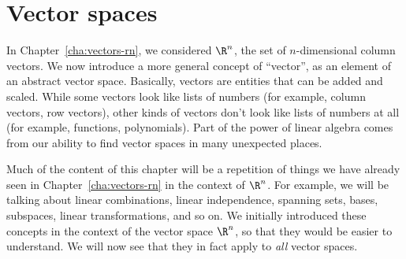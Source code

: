 \chapter{Vector spaces}

In Chapter~\ref{cha:vectors-rn}, we considered $\R^n$, the set of
$n$-dimensional column vectors. We now introduce a more general
concept of ``vector'', as an element of an abstract vector
space. Basically, vectors are entities that can be added and
scaled. While some vectors look like lists of numbers (for example,
column vectors, row vectors), other kinds of vectors don't look like
lists of numbers at all (for example, functions, polynomials). Part of
the power of linear algebra comes from our ability to find vector
spaces in many unexpected places.

Much of the content of this chapter will be a repetition of things we
have already seen in Chapter~\ref{cha:vectors-rn} in the context of
$\R^n$. For example, we will be talking about linear combinations,
linear independence, spanning sets, bases, subspaces, linear
transformations, and so on. We initially introduced these concepts in
the context of the vector space $\R^n$, so that they would be easier
to understand. We will now see that they in fact apply to \textit{all}
vector spaces.

